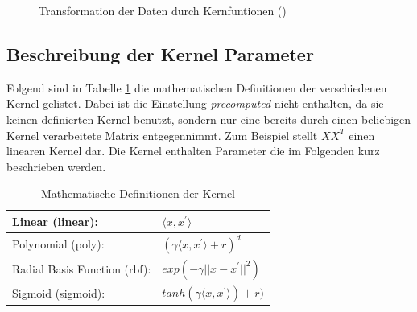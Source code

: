 \begin{figure}[h]
	\centering
	\hfill
	\caption{Transformation der Daten durch Kernfuntionen (\cite{2018_mello_ponti})}
\end{figure}
\subsection{Beschreibung der Kernel Parameter}
Folgend sind in Tabelle \ref{tab:svm_kernel} die mathematischen Definitionen der verschiedenen Kernel gelistet. Dabei ist die Einstellung \emph{precomputed} nicht enthalten, da sie keinen definierten Kernel benutzt, sondern nur eine bereits durch einen beliebigen Kernel verarbeitete Matrix entgegennimmt. Zum Beispiel stellt $XX^{T}$ einen linearen Kernel dar. Die Kernel enthalten Parameter die im Folgenden kurz beschrieben werden.
\begin{table}[h]
	\centering
	\begin{tabular}{ll}
		\hline
		Linear (linear): &$\langle x,x^{'}\rangle$\\ \hline
		Polynomial (poly): &$(\gamma\langle x,x^{'}\rangle + r)^{d}$\\ \hline
		Radial Basis Function (rbf): &$exp(-\gamma ||x-x^{'}||^{2})$\\ \hline
		Sigmoid (sigmoid): &$tanh(\gamma \langle x,x^{'}\rangle) + r)$ \\\hline
		\hline
	\end{tabular}
	\caption{Mathematische Definitionen der Kernel}
	\label{tab:svm_kernel} 
\end{table}

